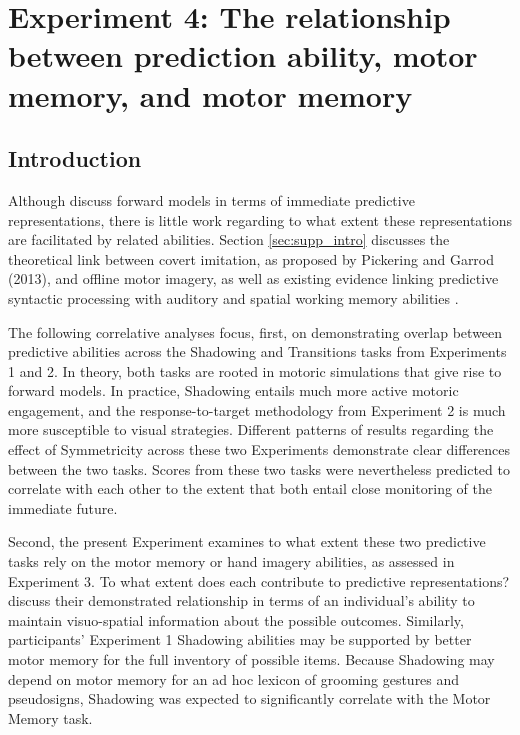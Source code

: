 \section{Experiment 4: The relationship between prediction ability, motor memory, and motor memory} 
    \label{ch:correl}
    \subsection{Introduction}
            Although  discuss forward models in terms of immediate predictive representations, there is little work regarding to what extent these representations are facilitated by related abilities. Section \ref{sec:supp_intro} discusses the theoretical link between covert imitation, as proposed by Pickering and Garrod (2013), and offline motor imagery, as well as existing evidence linking predictive syntactic processing with auditory and spatial working memory abilities \cite{huettig2016}. \par
            The following correlative analyses focus, first, on demonstrating overlap between predictive abilities across the Shadowing and Transitions tasks from Experiments 1 and 2. In theory, both tasks are rooted in motoric simulations that give rise to forward models. In practice, Shadowing entails much more active motoric engagement, and the response-to-target methodology from Experiment 2 is much more susceptible to visual strategies. Different patterns of results regarding the effect of Symmetricity across these two Experiments demonstrate clear differences between the two tasks. Scores from these two tasks were nevertheless predicted to correlate with each other to the extent that both entail close monitoring of the immediate future. \par
            Second, the present Experiment examines to what extent these two predictive tasks rely on the motor memory or hand imagery abilities, as assessed in Experiment 3. To what extent does each contribute to predictive representations?  discuss their demonstrated relationship in terms of an individual’s ability to maintain visuo-spatial information about the possible outcomes. Similarly, participants’ Experiment 1 Shadowing abilities may be supported by better motor memory for the full inventory of possible items. Because Shadowing may depend on motor memory for an ad hoc lexicon of grooming gestures and pseudosigns, Shadowing was expected to significantly correlate with the Motor Memory task.\par
